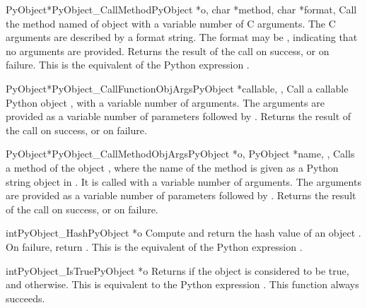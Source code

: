 \begin{cfuncdesc}{PyObject*}{PyObject_CallMethod}{PyObject *o,
                                                  char *method, char *format,
                                                  \moreargs}
  Call the method named  of object  with a variable
  number of C arguments.  The C arguments are described by a
   format string.  The format may be \NULL,
  indicating that no arguments are provided. Returns the result of the
  call on success, or \NULL{} on failure.  This is the equivalent of
  the Python expression .
\end{cfuncdesc}


\begin{cfuncdesc}{PyObject*}{PyObject_CallFunctionObjArgs}{PyObject *callable,
                                                           \moreargs,
                                                           }
  Call a callable Python object , with a variable
  number of  arguments.  The arguments are provided
  as a variable number of parameters followed by \NULL.
  Returns the result of the call on success, or \NULL{} on failure.
\end{cfuncdesc}


\begin{cfuncdesc}{PyObject*}{PyObject_CallMethodObjArgs}{PyObject *o,
                                                         PyObject *name,
                                                         \moreargs,
                                                         }
  Calls a method of the object , where the name of the method
  is given as a Python string object in .  It is called with
  a variable number of  arguments.  The arguments are
  provided as a variable number of parameters followed by \NULL.
  Returns the result of the call on success, or \NULL{} on failure.
\end{cfuncdesc}


\begin{cfuncdesc}{int}{PyObject_Hash}{PyObject *o}
  Compute and return the hash value of an object .  On failure,
  return .  This is the equivalent of the Python expression
  .
\end{cfuncdesc}


\begin{cfuncdesc}{int}{PyObject_IsTrue}{PyObject *o}
  Returns  if the object  is considered to be true, and
   otherwise.  This is equivalent to the Python expression
  .  This function always succeeds.
\end{cfuncdesc}


